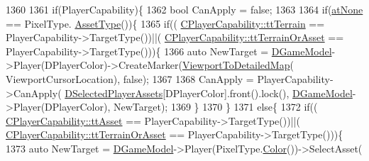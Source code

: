 \begin{DoxyCode}
1360                 
1361                                             \textcolor{keywordflow}{if}(PlayerCapability)\{
1362                                                 \textcolor{keywordtype}{bool} CanApply = \textcolor{keyword}{false};
1363 
1364                                                 \textcolor{keywordflow}{if}(\hyperlink{GameDataTypes_8h_a5600d4fc433b83300308921974477feca82fb51718e2c00981a2d37bc6fe92593}{atNone} == PixelType.
      \hyperlink{classCPixelType_addcf6c6d11e8ebafe4455beaa995b675}{AssetType}())\{
1365                                                     \textcolor{keywordflow}{if}((
      \hyperlink{classCPlayerCapability_a9d3450ed1532fd536bd6cbb1e2eef02fa465193c39da3100a1ce87c4a01a7ec2f}{CPlayerCapability::ttTerrain} == PlayerCapability->TargetType())||(
      \hyperlink{classCPlayerCapability_a9d3450ed1532fd536bd6cbb1e2eef02fa67cc6d11bc0aafc1b786bd6557ba4aa2}{CPlayerCapability::ttTerrainOrAsset} == PlayerCapability->TargetType()))\{
1366                                                         \textcolor{keyword}{auto} NewTarget = 
      \hyperlink{classCApplicationData_a32b50c7c1cbac3cfd67c7f775b1d6fee}{DGameModel}->Player(DPlayerColor)->CreateMarker(\hyperlink{classCApplicationData_a2871f1b0855d14ed77db1abd83585d64}{ViewportToDetailedMap}(
      ViewportCursorLocation), \textcolor{keyword}{false});
1367 
1368                                                         CanApply = PlayerCapability->CanApply(
      \hyperlink{classCApplicationData_a05c1087d5a5c4ddc14fcb37444f1642b}{DSelectedPlayerAssets}[DPlayerColor].front().lock(), 
      \hyperlink{classCApplicationData_a32b50c7c1cbac3cfd67c7f775b1d6fee}{DGameModel}->Player(DPlayerColor), NewTarget);  
1369                                                     \}
1370                                                 \}
1371                                                 \textcolor{keywordflow}{else}\{
1372                                                     \textcolor{keywordflow}{if}((
      \hyperlink{classCPlayerCapability_a9d3450ed1532fd536bd6cbb1e2eef02facb6ee2a28b5d50b9d3009c272f2881aa}{CPlayerCapability::ttAsset} == PlayerCapability->TargetType())||(
      \hyperlink{classCPlayerCapability_a9d3450ed1532fd536bd6cbb1e2eef02fa67cc6d11bc0aafc1b786bd6557ba4aa2}{CPlayerCapability::ttTerrainOrAsset} == PlayerCapability->TargetType()))\{
1373                                                         \textcolor{keyword}{auto} NewTarget = 
      \hyperlink{classCApplicationData_a32b50c7c1cbac3cfd67c7f775b1d6fee}{DGameModel}->Player(PixelType.\hyperlink{classCPixelType_a54864220447608dfad4cd579a5a4016c}{Color}())->SelectAsset(

\end{DoxyCode}
